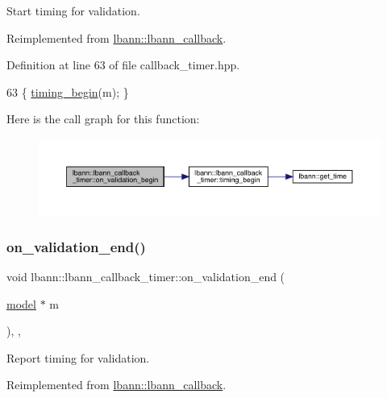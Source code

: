 Start timing for validation. 

Reimplemented from \hyperlink{classlbann_1_1lbann__callback_a2bde303671110519388d9962bc3e5583}{lbann\+::lbann\+\_\+callback}.



Definition at line 63 of file callback\+\_\+timer.\+hpp.


\begin{DoxyCode}
63 \{ \hyperlink{classlbann_1_1lbann__callback__timer_a5eb2a9d5c0c2fe4a7d7f45369928e2fd}{timing\_begin}(m); \}
\end{DoxyCode}
Here is the call graph for this function\+:\nopagebreak
\begin{figure}[H]
\begin{center}
\leavevmode
\includegraphics[width=350pt]{classlbann_1_1lbann__callback__timer_aa86c0ae1b6fbc878b6ba9a4551b803b8_cgraph}
\end{center}
\end{figure}
\mbox{\label{classlbann_1_1lbann__callback__timer_a0fea502078111627d340340a63768f9f}} 
\subsubsection{\texorpdfstring{on\+\_\+validation\+\_\+end()}{on\_validation\_end()}}
{\footnotesize\ttfamily void lbann\+::lbann\+\_\+callback\+\_\+timer\+::on\+\_\+validation\+\_\+end (\begin{DoxyParamCaption}\item[{\hyperlink{classlbann_1_1model}{model} $\ast$}]{m }\end{DoxyParamCaption})\hspace{0.3cm}{\ttfamily [inline]}, {\ttfamily [override]}, {\ttfamily [virtual]}}

Report timing for validation. 

Reimplemented from \hyperlink{classlbann_1_1lbann__callback_adc16e42e5064dc2dc8d84dfbfc1325eb}{lbann\+::lbann\+\_\+callback}.



